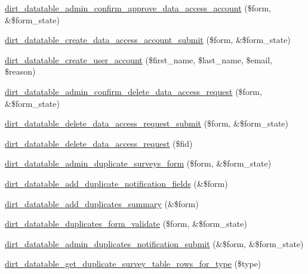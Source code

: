 \begin{DoxyCompactItemize}
\mbox{\hyperlink{dirt__datatable_8admin_8inc_a4cb59065e5b2b843acae7bf1e1d4045e}{dirt\+\_\+datatable\+\_\+admin\+\_\+confirm\+\_\+approve\+\_\+data\+\_\+access\+\_\+account}} (\$form, \&\$form\+\_\+state)
\item 
\mbox{\hyperlink{dirt__datatable_8admin_8inc_af9b65a403e11665e5573856111518ddb}{dirt\+\_\+datatable\+\_\+create\+\_\+data\+\_\+access\+\_\+account\+\_\+submit}} (\$form, \&\$form\+\_\+state)
\item 
\mbox{\hyperlink{dirt__datatable_8admin_8inc_a857bb2477715e6502056fa05e8f1ad9a}{dirt\+\_\+datatable\+\_\+create\+\_\+user\+\_\+account}} (\$first\+\_\+name, \$last\+\_\+name, \$email, \$reason)
\item 
\mbox{\hyperlink{dirt__datatable_8admin_8inc_a001308927f394711296e048e25e74640}{dirt\+\_\+datatable\+\_\+admin\+\_\+confirm\+\_\+delete\+\_\+data\+\_\+access\+\_\+request}} (\$form, \&\$form\+\_\+state)
\item 
\mbox{\hyperlink{dirt__datatable_8admin_8inc_a5cfa4a0f7fac0304b58fe5dbad5503e6}{dirt\+\_\+datatable\+\_\+delete\+\_\+data\+\_\+access\+\_\+request\+\_\+submit}} (\$form, \&\$form\+\_\+state)
\item 
\mbox{\hyperlink{dirt__datatable_8admin_8inc_a87211fbdc9e3ed5468b881e6d8ca0ee3}{dirt\+\_\+datatable\+\_\+delete\+\_\+data\+\_\+access\+\_\+request}} (\$fid)
\item 
\mbox{\hyperlink{dirt__datatable_8admin_8inc_a9089d27b4d87f72fcea0f13ed7ca049c}{dirt\+\_\+datatable\+\_\+admin\+\_\+duplicate\+\_\+surveys\+\_\+form}} (\$form, \&\$form\+\_\+state)
\item 
\mbox{\hyperlink{dirt__datatable_8admin_8inc_a9fb9ea8636dcfb0e9a09a45daf2a7dd2}{dirt\+\_\+datatable\+\_\+add\+\_\+duplicate\+\_\+notification\+\_\+fields}} (\&\$form)
\item 
\mbox{\hyperlink{dirt__datatable_8admin_8inc_a8e04a81f362f10be4cf4cd4d70957b41}{dirt\+\_\+datatable\+\_\+add\+\_\+duplicates\+\_\+summary}} (\&\$form)
\item 
\mbox{\hyperlink{dirt__datatable_8admin_8inc_a6f7f29fffcaa76911bb2a38716fcbb9e}{dirt\+\_\+datatable\+\_\+duplicates\+\_\+form\+\_\+validate}} (\$form, \&\$form\+\_\+state)
\item 
\mbox{\hyperlink{dirt__datatable_8admin_8inc_aea46cb4fd4302be5520d50765b072408}{dirt\+\_\+datatable\+\_\+admin\+\_\+duplicates\+\_\+notification\+\_\+submit}} (\&\$form, \&\$form\+\_\+state)
\item 
\mbox{\hyperlink{dirt__datatable_8admin_8inc_a56d0fb7ce2f22388f592a876f7111173}{dirt\+\_\+datatable\+\_\+get\+\_\+duplicate\+\_\+survey\+\_\+table\+\_\+rows\+\_\+for\+\_\+type}} (\$type)

\end{DoxyCompactItemize}
